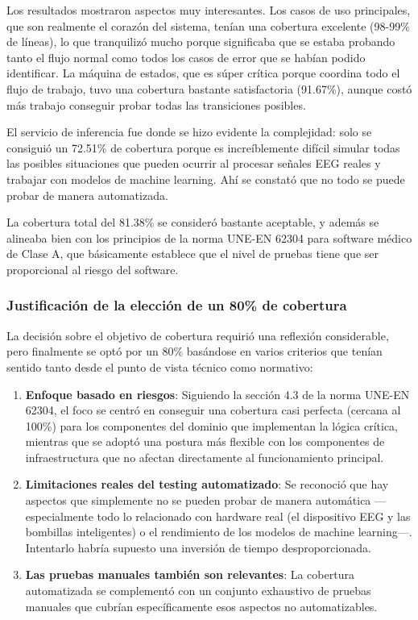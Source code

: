 Los resultados mostraron aspectos muy interesantes. Los casos de uso principales, que son realmente el corazón del sistema, tenían una cobertura excelente (98-99\% de líneas), lo que tranquilizó mucho porque significaba que se estaba probando tanto el flujo normal como todos los casos de error que se habían podido identificar. La máquina de estados, que es súper crítica porque coordina todo el flujo de trabajo, tuvo una cobertura bastante satisfactoria (91.67\%), aunque costó más trabajo conseguir probar todas las transiciones posibles.

El servicio de inferencia fue donde se hizo evidente la complejidad: solo se consiguió un 72.51\% de cobertura porque es increíblemente difícil simular todas las posibles situaciones que pueden ocurrir al procesar señales EEG reales y trabajar con modelos de machine learning. Ahí se constató que no todo se puede probar de manera automatizada.

La cobertura total del 81.38\% se consideró bastante aceptable, y además se alineaba bien con los principios de la norma UNE-EN 62304 para software médico de Clase A, que básicamente establece que el nivel de pruebas tiene que ser proporcional al riesgo del software.

\subsubsection{Justificación de la elección de un 80\% de cobertura}

La decisión sobre el objetivo de cobertura requirió una reflexión considerable, pero finalmente se optó por un 80\% basándose en varios criterios que tenían sentido tanto desde el punto de vista técnico como normativo:

\begin{enumerate}
    \item \textbf{Enfoque basado en riesgos}: Siguiendo la sección 4.3 de la norma UNE-EN 62304, el foco se centró en conseguir una cobertura casi perfecta (cercana al 100\%) para los componentes del dominio que implementan la lógica crítica, mientras que se adoptó una postura más flexible con los componentes de infraestructura que no afectan directamente al funcionamiento principal.
    
    \item \textbf{Limitaciones reales del testing automatizado}: Se reconoció que hay aspectos que simplemente no se pueden probar de manera automática —especialmente todo lo relacionado con hardware real (el dispositivo EEG y las bombillas inteligentes) o el rendimiento de los modelos de machine learning—. Intentarlo habría supuesto una inversión de tiempo desproporcionada.
    
    \item \textbf{Las pruebas manuales también son relevantes}: La cobertura automatizada se complementó con un conjunto exhaustivo de pruebas manuales que cubrían específicamente esos aspectos no automatizables.
\end{enumerate}

